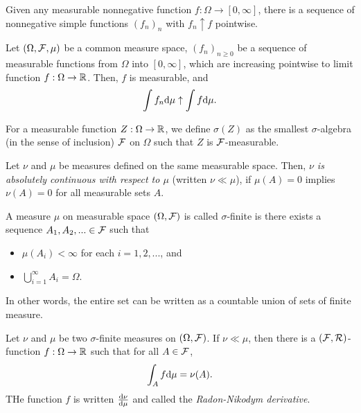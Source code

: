 \begin{prop}
    Given any measurable nonnegative function $f: \Omega \rightarrow [0, \infty]$, there is a sequence of nonnegative simple functions $(f_n)_n$ with $f_n \uparrow f$ pointwise.
\end{prop}
\begin{thm}
    Let $\left(\Omega, \mathcal{F}, \mu\right)$ be a common measure space, $(f_n)_{n \geq 0}$ be a sequence of measurable functions from $\Omega$ into $[0, \infty]$, which are increasing pointwise to limit function $f: \Omega \rightarrow \mathbb{R}$. Then, $f$ is measurable, and 
    \begin{align*}
        \int f_n \text{d} \mu \uparrow \int f \text{d} \mu.
    \end{align*}
\end{thm}
\begin{defi}
    For a measurable function $Z: \Omega \rightarrow \mathbb{R}$, we define $\sigma(Z)$ as the smallest $\sigma$-algebra (in the sense of inclusion) $\mathcal{F}$ on $\Omega$ such that $Z$ is $\mathcal{F}$-measurable.
\end{defi}
\begin{defi}
    Let $\nu$ and $\mu$ be measures defined on the same measurable space. Then, {\it $\nu$ is absolutely continuous with respect to $\mu$} (written $\nu \ll \mu$), if $\mu(A) = 0$ implies $\nu(A) = 0$ for all measurable sets $A$.
\end{defi}
\begin{defi}
    A measure $\mu$ on measurable space $\left(\Omega, \mathcal{F}\right)$ is called $\sigma$-finite is there exists a sequence $A_1, A_2, ... \in \mathcal{F}$ such that 
    \begin{itemize}
        \item $\mu(A_i) < \infty$ for each $i = 1, 2, ...$, and 
        \item $\bigcup_{i=1}^\infty A_i = \Omega$.
    \end{itemize}
    In other words, the entire set can be written as a countable union of sets of finite measure.
\end{defi}
\begin{thm}
    Let $\nu$ and $\mu$ be two $\sigma$-finite measures on $\left(\Omega, \mathcal{F}\right)$. If $\nu \ll \mu$, then there is a $\left(\mathcal{F}, \mathcal{R}\right)$-function $f: \Omega \rightarrow \mathbb{R}$ such that for all $A \in \mathcal{F}$,
    \begin{align*}
        \int_A f \text{d} \mu = \nu(A).
    \end{align*}
    THe function $f$ is written $\frac{\text{d} \nu}{\text{d} \mu}$ and called the {\it Radon-Nikodym derivative}.
\end{thm}


